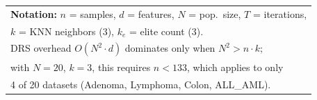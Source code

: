 \begin{table}[htbp]
\begin{tabular}{lll}
\midrule
\multicolumn{3}{l}{\textbf{Notation:} $n$ = samples, $d$ = features, $N$ = pop.\ size, $T$ = iterations,} \\
\multicolumn{3}{l}{$k$ = KNN neighbors ($3$), $k_e$ = elite count ($3$).} \\
\multicolumn{3}{l}{DRS overhead $O(N^2 \cdot d)$ dominates only when $N^2 > n \cdot k$;} \\
\multicolumn{3}{l}{with $N=20$, $k=3$, this requires $n < 133$, which applies to only} \\
\multicolumn{3}{l}{4 of 20 datasets (Adenoma, Lymphoma, Colon, ALL\_AML).} \\
\bottomrule
\end{tabular}
\end{table}
